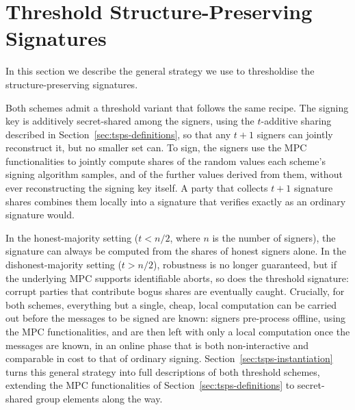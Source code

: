 \section{Threshold Structure-Preserving
Signatures}\label{sec:tsps-construction}

In this section we describe the general strategy we use to thresholdise the
structure-preserving signatures.

Both schemes admit a threshold variant that follows the same recipe. The
signing key is additively secret-shared among the signers, using the
$t$-additive sharing described in Section~\ref{sec:tsps-definitions}, so that
any $t+1$ signers can jointly reconstruct it, but no smaller set can.  To sign,
the signers use the MPC functionalities to jointly compute shares of the random
values each scheme's signing algorithm samples, and of the further values
derived from them, without ever reconstructing the signing key itself. A party
that collects $t+1$ signature shares combines them locally into a signature
that verifies exactly as an ordinary signature would.

In the honest-majority setting ($t < n/2$, where $n$ is the number of signers),
the signature can always be computed from the shares of honest signers alone.
In the dishonest-majority setting ($t > n/2$), robustness is no longer
guaranteed, but if the underlying MPC supports identifiable aborts, so does the
threshold signature: corrupt parties that contribute bogus shares are
eventually caught. Crucially, for both schemes, everything but a single, cheap,
local computation can be carried out before the messages to be signed are
known: signers pre-process offline, using the MPC functionalities, and are then
left with only a local computation once the messages are known, in an online
phase that is both non-interactive and comparable in cost to that of ordinary
signing.  Section~\ref{sec:tsps-instantiation} turns this general strategy into
full descriptions of both threshold schemes, extending the MPC functionalities
of Section~\ref{sec:tsps-definitions} to secret-shared group elements along the
way.
